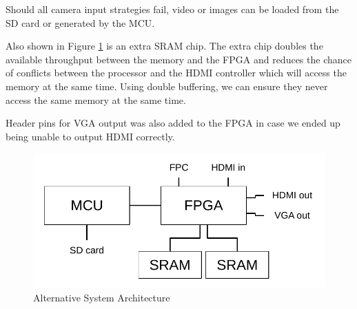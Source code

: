 Should all camera input strategies fail, video or images can be loaded from the SD card or generated by the MCU.

Also shown in Figure \ref{fig:SystemArchitectureAlternative} is an extra SRAM chip.
The extra chip doubles the available throughput between the memory and the FPGA and reduces the chance of conflicts between the processor and the HDMI controller which will access the memory at the same time. Using double buffering, we can ensure they never access the same memory at the same time.

Header pins for VGA output was also added to the FPGA in case we ended up being unable to output HDMI correctly.

\begin{figure}
    \centering
    \includegraphics{img/SystemArchitectureAlternative.pdf}
    \caption{Alternative System Architecture}
    \label{fig:SystemArchitectureAlternative}
\end{figure}
